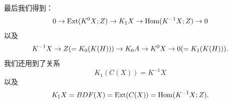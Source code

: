最后我们得到：
\[
  0 \to \operatorname{Ext}(K^0X;Z) \to K_1 X \to \operatorname{Hom}(K^{-1}X;Z) \to 0
\]
以及
\[
  K^{-1}X \to Z(=K_0(K(H))) \to K_0 A \to K^0 X \to 0(=K_1(K(H))).
\]
我们还用到了关系
\[
  K_1(C(X)) = K^{-1}X
\]
以及
\[
  K_1 X = BDF(X) = \operatorname{Ext}(C(X)) = \operatorname{Hom}(K^{-1}X;Z).
\]

